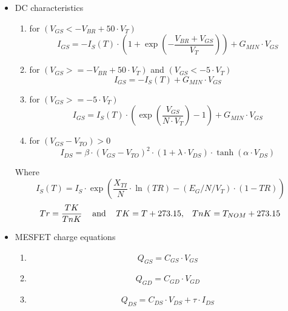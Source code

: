 
\begin{itemize}
 \item DC characteristics
\begin{enumerate}
 \item for $\left( V_{GS}<-V_{BR}+50 \cdot V_T\right)$
 \begin{equation}
I_{GS} = -I_S\left(T\right)\cdot\left(1+\exp\left( -\dfrac{V_{BR}+V_{GS}}{V_T}\right)\right)  + G_{MIN} \cdot V_{GS}
\end{equation} 
 \item for $\left( V_{GS}>=-V_{BR}+50 \cdot V_T\right)$ and $\left( V_{GS}<-5 \cdot V_T\right)$
 \begin{equation}
 I_{GS}= -I_S\left(T\right)+G_{MIN} \cdot V_{GS}
       \end{equation} 
 \item for $\left( V_{GS}>=-5 \cdot V_T \right)$
 \begin{equation}
  I_{GS}=I_S\left(T\right)\cdot\left( \exp\left(\dfrac{V_{GS}}{N \cdot V_T}\right) - 1\right) + G_{MIN} \cdot V_{GS}
       \end{equation} 
 \item for $\left(V_{GS}-V_{TO}\right)>0$
 \begin{equation}
        I_{DS}=\beta\cdot\left( V_{GS}-V_{TO}\right)^{2}\cdot\left( 1+\lambda \cdot V_{DS}\right)\cdot \tanh\left( \alpha \cdot V_{DS}\right)
       \end{equation} 

       
\end{enumerate}

Where
\begin{equation}
 I_S\left(T\right)=I_S \cdot \exp\left( \dfrac{X_{TI}}{N}\cdot\ln(TR)-\left(  E_G/N/V_T\right)\cdot\left(1-TR\right)\right)  
\end{equation} 
\begin{equation}
 Tr=\dfrac{TK}{TnK}\hspace{3mm} \textrm{ and }  \hspace{3mm} TK=T+273.15, \hspace{3mm} TnK=T_{NOM}+273.15
\end{equation} 

\item MESFET charge equations

\begin{enumerate}
 \item \begin{equation}
        Q_{GS} = C_{GS} \cdot V_{GS}
       \end{equation} 
 \item \begin{equation}
        Q_{GD} = C_{GD} \cdot V_{GD}
       \end{equation} 
 \item \begin{equation}
        Q_{DS} = C_{DS} \cdot V_{DS} + \tau \cdot I_{DS}
       \end{equation} 
\end{enumerate}
\end{itemize}

